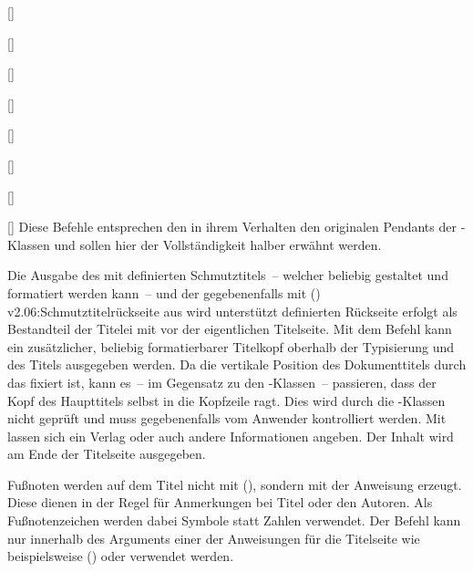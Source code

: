 \begin{Declaration*}{}
\begin{Declaration*}{}
\begin{Declaration*}{}
\begin{Bundle}{}
\begin{Declaration}{[]}
\begin{Declaration}{[]}
\begin{Declaration}{[]}
\begin{Declaration}{[]}
\begin{Declaration}{[]}
\begin{Declaration}{[]}
\begin{Declaration}{[]}
\begin{Declaration}{[]}
\printdeclarationlist%
%
Diese Befehle entsprechen den in ihrem Verhalten den originalen Pendants der 
\KOMAScript-Klassen und sollen hier der Vollständigkeit halber erwähnt werden.

Die Ausgabe des mit  definierten Schmutztitels~-- welcher 
beliebig gestaltet und formatiert werden kann~-- und der gegebenenfalls mit 
(){%
  v2.06:Schmutztitelrückseite aus  wird unterstützt%
}%
 definierten Rückseite erfolgt als Bestandteil der Titelei 
mit  vor der eigentlichen Titelseite. Mit dem Befehl 
 kann ein zusätzlicher, beliebig formatierbarer Titelkopf 
oberhalb der Typisierung und des Titels ausgegeben werden. Da die vertikale 
Position des Dokumenttitels durch das \CD fixiert ist, kann es~-- im Gegensatz 
zu den \KOMAScript-Klassen~-- passieren, dass der Kopf des Haupttitels selbst 
in die Kopfzeile ragt. Dies wird durch die \TUDScript-Klassen nicht geprüft und 
muss gegebenenfalls vom Anwender kontrolliert werden. Mit  
lassen sich ein Verlag oder auch andere Informationen angeben. Der Inhalt wird 
am Ende der Titelseite ausgegeben.

Fußnoten werden auf dem Titel nicht mit 
(), sondern mit der Anweisung 
 erzeugt. Diese dienen in der Regel für Anmerkungen bei Titel 
oder den Autoren. Als Fußnotenzeichen werden dabei Symbole statt Zahlen 
verwendet. Der Befehl  kann nur innerhalb des Arguments einer der 
Anweisungen für die Titelseite wie beispielsweise () oder 
 verwendet werden.


\end{Declaration}
\end{Declaration}
\end{Declaration}
\end{Declaration}
\end{Declaration}
\end{Declaration}
\end{Declaration}
\end{Declaration}
\end{Bundle}
\end{Declaration*}
\end{Declaration*}
\end{Declaration*}
